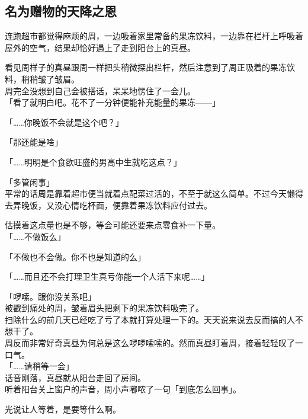 \subsection{名为赠物的天降之恩}

连跑超市都觉得麻烦的周，一边吸着家里常备的果冻饮料，一边靠在栏杆上呼吸着屋外的空气，结果却恰好遇上了走到阳台上的真昼。

看见周样子的真昼跟周一样把头稍微探出栏杆，然后注意到了周正吸着的果冻饮料，稍稍皱了皱眉。\\

周完全没想到自己会被搭话，呆呆地愣住了一会儿。\\

「看了就明白吧。花不了一分钟便能补充能量的果冻——」

「……你晚饭不会就是这个吧？」

「那还能是啥」

「……明明是个食欲旺盛的男高中生就吃这点？」

「多管闲事」\\

平常的话周是靠着超市便当就着点配菜过活的，不至于就这么简单。不过今天懒得去弄晚饭，又没心情吃杯面，便靠着果冻饮料应付过去。

估摸着这点量也是不够，等会可能还要来点零食补一下量。\\

「……不做饭么」

「不做也不会做。你不也是知道的么」

「……而且还不会打理卫生真亏你能一个人活下来呢……」

「啰嗦。跟你没关系吧」\\

被戳到痛处的周，皱着眉头把剩下的果冻饮料吸完了。\\

扫除什么的前几天已经吃了亏了本就打算处理一下的。天天说来说去反而搞的人不想干了。\\

周反而非常好奇真昼为何总是这么啰啰嗦嗦的。然而真昼盯着周，接着轻轻叹了一口气。\\

「……请稍等一会」\\

话音刚落，真昼就从阳台走回了房间。\\

听着阳台关上窗户的声音，周小声嘟哝了一句「到底怎么回事」。

光说让人等着，是要等什么啊。\\

